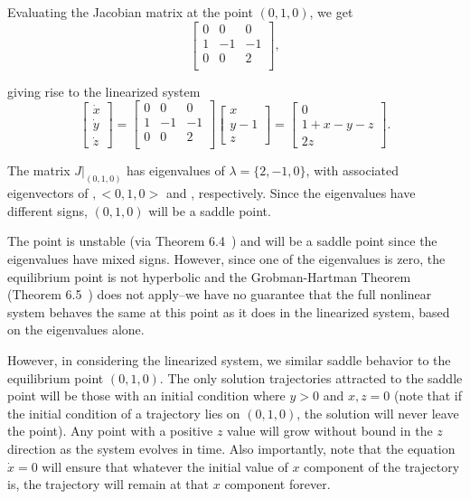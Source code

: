 \documentclass[10pt]{article}
\begin{document}
Evaluating the Jacobian matrix at the point \((0,1,0)\), we get 
\[
\left[ 
\begin{array}{ccc}
0 & 0 & 0 \\
1 & -1 & -1 \\
0 & 0 & 2 \\
\end{array}
\right],
\]

giving rise to the linearized system
\[
\begin{bmatrix}
\dot{x} \\ \dot{y} \\ \dot{z}
\end{bmatrix} = 
\left[ 
\begin{array}{ccc}
0 & 0 & 0 \\
1 & -1 & -1 \\
0 & 0 & 2 \\
\end{array}
\right]
\begin{bmatrix}
x \\ y-1  \\ z
\end{bmatrix} =
\begin{bmatrix}
0 \\ 1+x-y-z \\ 2z
\end{bmatrix}.
\]

The matrix \(J|_{(0,1,0)}\) has eigenvalues of \(\lambda = \{2,-1,0\}\), with associated eigenvectors of \(<0,-1,3>,<0,1,0>\) and \(<1,1,0>\), respectively. Since the eigenvalues have different signs, \( (0,1,0) \) will be a saddle point.

The point is unstable (via Theorem 6.4~\cite{PLT}) and will be a saddle point since the eigenvalues have mixed signs. However, since one of the eigenvalues is zero, the equilibrium point is not hyperbolic and the Grobman-Hartman Theorem (Theorem 6.5~\cite{PLT}) does not apply--we have no guarantee that the full nonlinear system behaves the same at this point as it does in the linearized system, based on the eigenvalues alone.

However, in considering the linearized system, we similar saddle behavior to the equilibrium point \((0,1,0)\). The only solution trajectories attracted to the saddle point will be those with an initial condition where \(y>0\) and \(x,z=0\) (note that if the initial condition of a trajectory lies on \((0,1,0)\), the solution will never leave the point). Any point with a positive \(z\) value will grow without bound in the \(z\) direction as the system evolves in time. Also importantly, note that the equation \(\dot{x}=0\) will ensure that whatever the initial value of \(x\) component of the trajectory is, the trajectory will remain at that \(x\) component forever.
\end{document}
